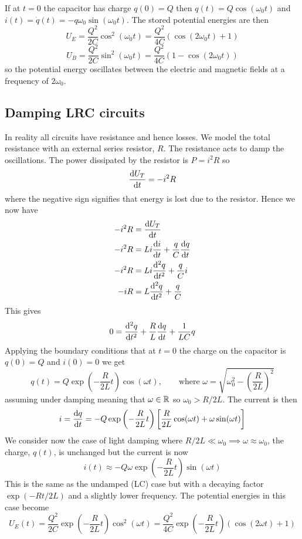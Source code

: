 \documentclass{article}
\begin{document}
    \example
    If at \(t = 0\) the capacitor has charge \(q(0) = Q\) then \(q(t) = Q\cos(\omega_0 t)\) and \(i(t) = \dot q(t) = -q\omega_0\sin(\omega_0 t)\).
    The stored potential energies are then
    \[U_E = \frac{Q^2}{2C}\cos^2(\omega_0 t) = \frac{Q^2}{4C}(\cos(2\omega_0 t) + 1)\]
    \[U_B = \frac{Q^2}{2C}\sin^2(\omega_0 t) = \frac{Q^2}{4C}(1 - \cos(2\omega_0 t))\]
    so the potential energy oscillates between the electric and magnetic fields at a frequency of \(2\omega_0\).
    
    \subsection{Damping LRC circuits}
    In reality all circuits have resistance and hence losses.
    We model the total resistance with an external series resistor, \(R\).
    The resistance acts to damp the oscillations.
    The power dissipated by the resistor is \(P = i^2R\) so
    \[\dv{U_T}{t} = -i^2R\]
    where the negative sign signifies that energy is lost due to the resistor.
    Hence we now have
    \begin{align*}
        -i^2 R &= \dv{U_T}{t}\\
        -i^2 R &= Li\dv{i}{t} + \frac{q}{C}\dv{q}{t}\\
        -i^2 R &= Li\dv[2]{q}{t} + \frac{q}{C}i\\
        -iR &= L\dv[2]{q}{t} + \frac{q}{C}\\
    \end{align*}
    This gives
    \[0 = \dv[2]{q}{t} + \frac{R}{L}\dv{q}{t} + \frac{1}{LC}q\]
    Applying the boundary conditions that at \(t = 0\) the charge on the capacitor is \(q(0) = Q\) and \(i(0) = 0\) we get
    \[q(t) = Q\exp\left(-\frac{R}{2L}t\right)\cos(\omega t),\qquad\text{where }\omega = \sqrt{\omega_0^2 - \left(\frac{R}{2L}\right)^2}\]
    assuming under damping meaning that \(\omega\in\mathbb{R}\) so \(\omega_0 > R/2L\).
    The current is then
    \[i = \dv{q}{t} = -Q\exp\left(-\frac{R}{2L}t\right)\left[\frac{R}{2L}\cos(\omega t) + \omega\sin(\omega t)\right]\]
    We consider now the case of light damping where \(R/2L\ll\omega_0\implies\omega\approx\omega_0\), the charge, \(q(t)\), is unchanged but the current is now
    \[i(t)\approx -Q\omega\exp\left(-\frac{R}{2L}t\right)\sin(\omega t)\]
    This is the same as the undamped (LC) case but with a decaying factor \(\exp(-Rt/2L)\) and a slightly lower frequency.
    The potential energies in this case become
    \[U_E(t) = \frac{Q^2}{2C}\exp\left(-\frac{R}{2L}t\right)\cos^2(\omega t) = \frac{Q^2}{4C}\exp\left(-\frac{R}{2L}t\right)(\cos(2\omega t) + 1)\]
\end{document}
